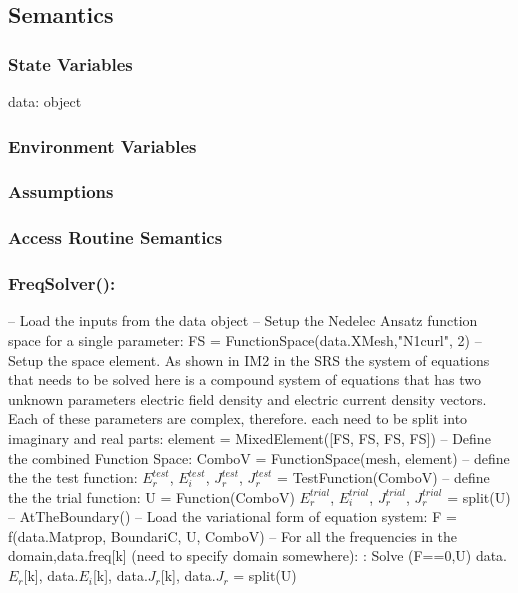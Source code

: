 \documentclass[12pt, titlepage]{article}
\begin{document}
\subsection{Semantics}

\subsubsection{State Variables}

data: object

\subsubsection{Environment Variables}


\subsubsection{Assumptions}


\subsubsection{Access Routine Semantics}

\subsubsection*{FreqSolver():}
\subitem -- Load the inputs from the data object
\subitem -- Setup the Nedelec Ansatz function space for a single parameter: 
\subsubitem FS = FunctionSpace(data.XMesh,"N1curl", 2)
\subitem -- Setup the space element. As shown in IM2 in the SRS the system of equations that needs to be solved here is a compound system of equations that has two unknown parameters electric field density and electric current density vectors. Each of these parameters are complex, therefore. each need to be split into imaginary and real parts: 
\subsubitem element = MixedElement([FS, FS, FS, FS])
\subitem -- Define the combined Function Space:
\subsubitem  ComboV = FunctionSpace(mesh, element)
\subitem -- define the the test function: 
\subsubitem $E^{test}_r$, $E^{test}_i$, $J^{test}_r$, $J^{test}_r$ = TestFunction(ComboV) 
\subitem -- define the the trial function: 
\subsubitem U = Function(ComboV)
\subsubitem $E^{trial}_r$, $E^{trial}_i$, $J^{trial}_r$, $J^{trial}_r$ = split(U) 
\subitem -- AtTheBoundary()
\subitem -- Load the variational form of equation system: 
F = f(data.Matprop, BoundariC, U, ComboV)
\subitem -- For all the frequencies in the domain,data.freq[k] (need to specify domain somewhere):
\subsubitem:  Solve (F==0,U)
\subsubitem data.$E_r$[k], data.$E_i$[k], data.$J_r$[k], data.$J_r$ = split(U) 
\end{document}
